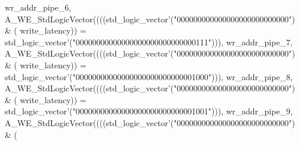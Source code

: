 \begin{DoxyCode}
{      wr_addr_pipe_6}\textcolor{vhdlchar}{,} \textcolor{vhdlchar}{A\_WE\_StdLogicVector}\textcolor{vhdlchar}{(}\textcolor{vhdlchar}{(}\textcolor{vhdlchar}{(}\textcolor{vhdlchar}{(}\textcolor{comment}{std\_logic\_vector}\textcolor{vhdlchar}{'}\textcolor{vhdlchar}{(}\textcolor{vhdllogic}{"000000000000000000000000000"}\textcolor{vhdlchar}{)} \textcolor{vhdlchar}{&} \textcolor{vhdlchar}{(}\textcolor{vhdlchar}{
      write_latency}\textcolor{vhdlchar}{)}\textcolor{vhdlchar}{)} \textcolor{vhdlchar}{=} \textcolor{comment}{std\_logic\_vector}\textcolor{vhdlchar}{'}\textcolor{vhdlchar}{(}\textcolor{vhdllogic}{"00000000000000000000000000000111"}\textcolor{vhdlchar}{)}\textcolor{vhdlchar}{)}\textcolor{vhdlchar}{)}\textcolor{vhdlchar}{,} \textcolor{vhdlchar}{
      wr_addr_pipe_7}\textcolor{vhdlchar}{,} \textcolor{vhdlchar}{A\_WE\_StdLogicVector}\textcolor{vhdlchar}{(}\textcolor{vhdlchar}{(}\textcolor{vhdlchar}{(}\textcolor{vhdlchar}{(}\textcolor{comment}{std\_logic\_vector}\textcolor{vhdlchar}{'}\textcolor{vhdlchar}{(}\textcolor{vhdllogic}{"000000000000000000000000000"}\textcolor{vhdlchar}{)} \textcolor{vhdlchar}{&} \textcolor{vhdlchar}{(}\textcolor{vhdlchar}{
      write_latency}\textcolor{vhdlchar}{)}\textcolor{vhdlchar}{)} \textcolor{vhdlchar}{=} \textcolor{comment}{std\_logic\_vector}\textcolor{vhdlchar}{'}\textcolor{vhdlchar}{(}\textcolor{vhdllogic}{"00000000000000000000000000001000"}\textcolor{vhdlchar}{)}\textcolor{vhdlchar}{)}\textcolor{vhdlchar}{)}\textcolor{vhdlchar}{,} \textcolor{vhdlchar}{
      wr_addr_pipe_8}\textcolor{vhdlchar}{,} \textcolor{vhdlchar}{A\_WE\_StdLogicVector}\textcolor{vhdlchar}{(}\textcolor{vhdlchar}{(}\textcolor{vhdlchar}{(}\textcolor{vhdlchar}{(}\textcolor{comment}{std\_logic\_vector}\textcolor{vhdlchar}{'}\textcolor{vhdlchar}{(}\textcolor{vhdllogic}{"000000000000000000000000000"}\textcolor{vhdlchar}{)} \textcolor{vhdlchar}{&} \textcolor{vhdlchar}{(}\textcolor{vhdlchar}{
      write_latency}\textcolor{vhdlchar}{)}\textcolor{vhdlchar}{)} \textcolor{vhdlchar}{=} \textcolor{comment}{std\_logic\_vector}\textcolor{vhdlchar}{'}\textcolor{vhdlchar}{(}\textcolor{vhdllogic}{"00000000000000000000000000001001"}\textcolor{vhdlchar}{)}\textcolor{vhdlchar}{)}\textcolor{vhdlchar}{)}\textcolor{vhdlchar}{,} \textcolor{vhdlchar}{
      wr_addr_pipe_9}\textcolor{vhdlchar}{,} \textcolor{vhdlchar}{A\_WE\_StdLogicVector}\textcolor{vhdlchar}{(}\textcolor{vhdlchar}{(}\textcolor{vhdlchar}{(}\textcolor{vhdlchar}{(}\textcolor{comment}{std\_logic\_vector}\textcolor{vhdlchar}{'}\textcolor{vhdlchar}{(}\textcolor{vhdllogic}{"000000000000000000000000000"}\textcolor{vhdlchar}{)} \textcolor{vhdlchar}{&} \textcolor{vhdlchar}{(}\textcolor{vhdlchar}{
}
\end{DoxyCode}
